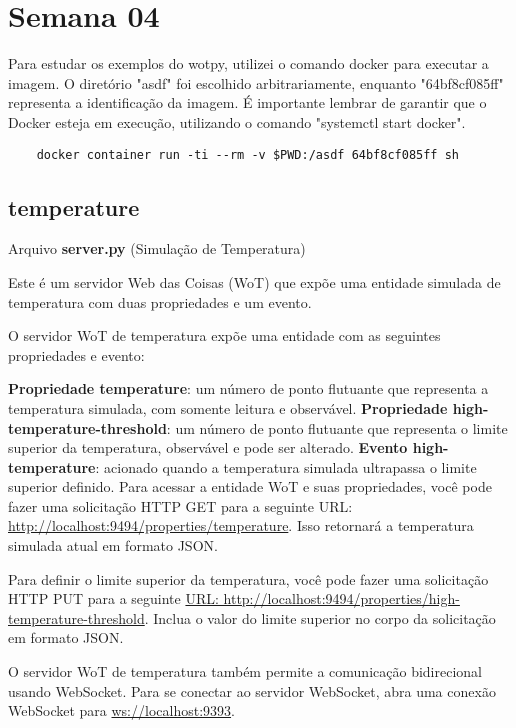 
\section{Semana 04}

Para estudar os exemplos do wotpy, utilizei o comando docker para executar a imagem. O diretório "asdf" foi escolhido arbitrariamente, enquanto "64bf8cf085ff" representa a identificação da imagem. É importante lembrar de garantir que o Docker esteja em execução, utilizando o comando "systemctl start docker".

\begin{verbatim}
    docker container run -ti --rm -v $PWD:/asdf 64bf8cf085ff sh
\end{verbatim}

\subsection{temperature}

Arquivo \textbf{server.py} (Simulação de Temperatura)

Este é um servidor Web das Coisas (WoT) que expõe uma entidade simulada de temperatura com duas propriedades e um evento.

O servidor WoT de temperatura expõe uma entidade com as seguintes propriedades e evento:

\textbf{Propriedade temperature}: um número de ponto flutuante que representa a temperatura simulada, com somente leitura e observável.
\textbf{Propriedade high-temperature-threshold}: um número de ponto flutuante que representa o limite superior da temperatura, observável e pode ser alterado.
\textbf{Evento high-temperature}: acionado quando a temperatura simulada ultrapassa o limite superior definido.
Para acessar a entidade WoT e suas propriedades, você pode fazer uma solicitação HTTP GET para a seguinte URL: \url{http://localhost:9494/properties/temperature}. Isso retornará a temperatura simulada atual em formato JSON.

Para definir o limite superior da temperatura, você pode fazer uma solicitação HTTP PUT para a seguinte \url{URL: http://localhost:9494/properties/high-temperature-threshold}. Inclua o valor do limite superior no corpo da solicitação em formato JSON.

O servidor WoT de temperatura também permite a comunicação bidirecional usando WebSocket. Para se conectar ao servidor WebSocket, abra uma conexão WebSocket para \url{ws://localhost:9393}.

